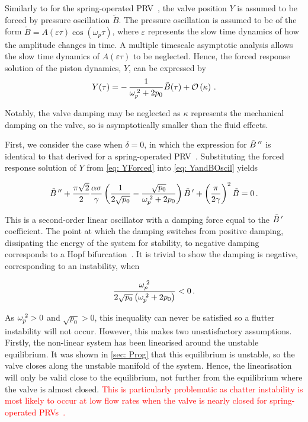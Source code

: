 Similarly to for the spring-operated PRV~\cite{Hos2015ModelPipe}, the valve position $Y$ is assumed to be forced by pressure oscillation $\tilde{B}$. The pressure oscillation is assumed to be of the form $\tilde{B} = A(\varepsilon \tau) \cos\left( \omega_p \tau \right)$, where $\varepsilon$ represents the slow time dynamics of how the amplitude changes in time. A multiple timescale asymptotic analysis allows the slow time dynamics of $A(\varepsilon \tau)$ to be neglected. Hence, the forced response solution of the piston dynamics, $Y$, can be expressed by
~
\begin{equation} \label{eq: YForced}
    Y(\tau) = - \, \frac{1}{\omega_p^{\;2} + 2 p_0} \tilde{B}(\tau) + \mathcal{O}\left( \kappa \right) \, .
\end{equation}

Notably, the valve damping may be neglected as $\kappa$ represents the mechanical damping on the valve, so is asymptotically smaller than the fluid effects.

First, we consider the case when $\delta = 0$, in which the expression for $\tilde{B}\,{''}$ is identical to that derived for a spring-operated PRV~\cite{Hos2015DynamicModelling}. Substituting the forced response solution of $Y$ from \cref{eq: YForced} into \cref{eq: YandBOscil} yields

\begin{equation*}
    \tilde{B}\,{''} + \frac{\pi \sqrt{2}}{2} \frac{\alpha \sigma}{\gamma} \left( \frac{1}{2 \sqrt{p_0}} - \frac{\sqrt{p_0}}{\omega_p^{\;2}+2 p_0} \right) \tilde{B}\,{'} + \left( \frac{\pi}{2 \gamma} \right)^2 \tilde{B} = 0 \, .
\end{equation*}

\newpage
This is a second-order linear oscillator with a damping force equal to the $\tilde{B}\,{'}$ coefficient. The point at which the damping switches from positive damping, dissipating the energy of the system for stability, to negative damping corresponds to a Hopf bifurcation~\cite{Kuznetsov2004ElementsTheory}. It is trivial to show the damping is negative, corresponding to an instability, when

\begin{equation*}
    \frac{\omega_p^{\;2}}{2 \sqrt{p_0} \left( \omega_p^{\;2} + 2 p_0 \right)} < 0 \, .
\end{equation*}

As $\omega_p^{\;2} > 0$ and $\sqrt{p_0} > 0$, this inequality can never be satisfied so a flutter instability will not occur. However, this makes two unsatisfactory assumptions. Firstly, the non-linear system has been linearised around the unstable equilibrium. It was shown in \cref{sec: Prog} that this equilibrium is unstable, so the valve closes along the unstable manifold of the system. Hence, the linearisation will only be valid close to the equilibrium, not further from the equilibrium where the valve is almost closed. \textcolor{Red}{This is particularly problematic as chatter instability is most likely to occur at low flow rates when the valve is nearly closed for spring-operated PRVs~\cite{Hos2016DynamicService}.}

